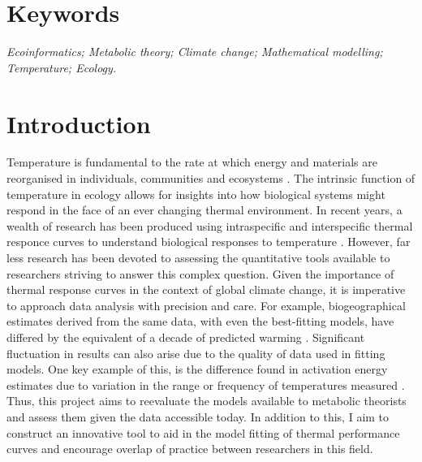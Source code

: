 \documentclass[
11pt, %
onehalfspacing, %
parskip, %
headsepline, %
]{article} %
\begin{document}
\begin{linenumbers}
\maketitle
\section*{Keywords}
\emph{Ecoinformatics; Metabolic theory; Climate change; Mathematical modelling; Temperature; Ecology.}


\maketitle
\section*{Introduction}
Temperature is fundamental to the rate at which energy and materials are reorganised in individuals, communities and ecosystems \citep{Brown2004}. The intrinsic function of temperature in ecology allows for insights into how biological systems might respond in the face of an ever changing thermal environment. In recent years, a wealth of research has been produced using intraspecific and interspecific thermal responce curves to understand biological responses to temperature \citep{Dell2011} \citep{Thomas2012}. However, far less research has been devoted to assessing the quantitative tools available to researchers striving to answer this complex question. Given the importance of thermal response curves in the context of global climate change, it is imperative to approach data analysis with precision and care. For example, biogeographical estimates derived from the same data, with even the best-fitting models, have differed by the equivalent of a decade of predicted warming \citep{Low-Decarie2017}. Significant fluctuation in results can also arise due to the quality of data used in fitting models. One key example of this, is the difference found in activation energy estimates due to variation in the range or frequency of temperatures measured \citep{Pawar2016}.
Thus, this project aims to reevaluate the models available to metabolic theorists and assess them given the data accessible today. In addition to this, I aim to construct an innovative tool to aid in the model fitting of thermal performance curves and encourage overlap of practice between researchers in this field.

\maketitle

\end{linenumbers}
\end{document}
